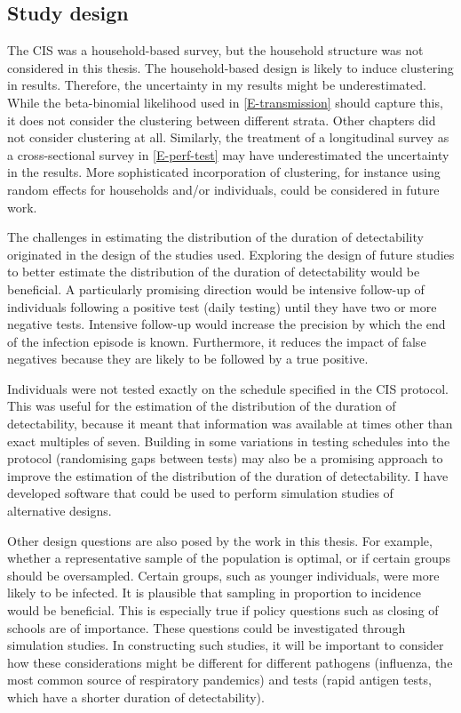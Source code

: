 \documentclass[thesis.tex]{subfiles}
\begin{document}
\subsection{Study design}

The CIS was a household-based survey, but the household structure was not considered in this thesis.
The household-based design is likely to induce clustering in results.
Therefore, the uncertainty in my results might be underestimated.
While the beta-binomial likelihood used in \cref{E-transmission} should capture this, it does not consider the clustering between different strata.
Other chapters did not consider clustering at all.
Similarly, the treatment of a longitudinal survey as a cross-sectional survey in \cref{E-perf-test} may have underestimated the uncertainty in the results.
More sophisticated incorporation of clustering, for instance using random effects for households and/or individuals, could be considered in future work.

The challenges in estimating the distribution of the duration of detectability originated in the design of the studies used.
Exploring the design of future studies to better estimate the distribution of the duration of detectability would be beneficial.
A particularly promising direction would be intensive follow-up of individuals following a positive test (\eg daily testing) until they have two or more negative tests.
Intensive follow-up would increase the precision by which the end of the infection episode is known.
Furthermore, it reduces the impact of false negatives because they are likely to be followed by a true positive.

Individuals were not tested exactly on the schedule specified in the CIS protocol.
This was useful for the estimation of the distribution of the duration of detectability, because it meant that information was available at times other than exact multiples of seven.
Building in some variations in testing schedules into the protocol (\eg randomising gaps between tests) may also be a promising approach to improve the estimation of the distribution of the duration of detectability.
I have developed software that could be used to perform simulation studies of alternative designs.

Other design questions are also posed by the work in this thesis.
For example, whether a representative sample of the population is optimal, or if certain groups should be oversampled.
Certain groups, such as younger individuals, were more likely to be infected.
It is plausible that sampling in proportion to incidence would be beneficial.
This is especially true if policy questions such as closing of schools are of importance.
These questions could be investigated through simulation studies.
In constructing such studies, it will be important to consider how these considerations might be different for different pathogens (\eg influenza, the most common source of respiratory pandemics) and tests (\eg rapid antigen tests, which have a shorter duration of detectability).
\end{document}
